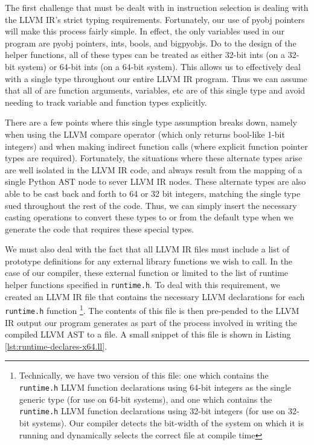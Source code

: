 \documentclass[11pt,twocolumn]{article}
\begin{document}

The first challenge that must be dealt with in instruction selection
is dealing with the LLVM IR's strict typing requirements. Fortunately,
our use of pyobj pointers will make this process fairly simple. In
effect, the only variables used in our program are pyobj pointers,
ints, bools, and bigpyobjs. Do to the design of the helper functions,
all of these types can be treated as either 32-bit ints (on a 32-bit
system) or 64-bit ints (on a 64-bit system). This allows us to
effectively deal with a single type throughout our entire LLVM IR
program. Thus we can assume that all of are function arguments,
variables, etc are of this single type and avoid needing to track
variable and function types explicitly.

There are a few points where this single type assumption breaks down,
namely when using the LLVM compare operator (which only returns
bool-like 1-bit integers) and when making indirect function calls
(where explicit function pointer types are required). Fortunately, the
situations where these alternate types arise are well isolated in the
LLVM IR code, and always result from the mapping of a single Python
AST node to sever LLVM IR nodes. These alternate types are also able
to be cast back and forth to 64 or 32 bit integers, matching the
single type sued throughout the rest of the code. Thus, we can simply
insert the necessary casting operations to convert these types to or
from the default type when we generate the code that requires these
special types. 


We must also deal with the fact that all LLVM IR files must include a
list of prototype definitions for any external library functions we wish
to call. In the case of our compiler, these external function or
limited to the list of runtime helper functions specified in
\texttt{runtime.h}. To deal with this requirement, we created an LLVM
IR file that contains the necessary LLVM declarations for each
\texttt{runtime.h} function
\footnote{Technically, we have two version
  of this file: one which contains the \texttt{runtime.h} LLVM
  function declarations using 64-bit integers as the single generic
  type (for use on 64-bit systems), and one which contains the
  \texttt{runtime.h} LLVM function declarations using 32-bit integers
  (for use on 32-bit systems). Our compiler detects the bit-width of
  the system on which it is running and dynamically selects the correct
  file at compile time}.
The contents of this file is then
pre-pended to the LLVM IR output our program generates as part of
the process involved in writing the compiled LLVM AST to a file. A
small snippet of this file is shown in Listing
\ref{lst:runtime-declares-x64.ll}.
\end{document}
